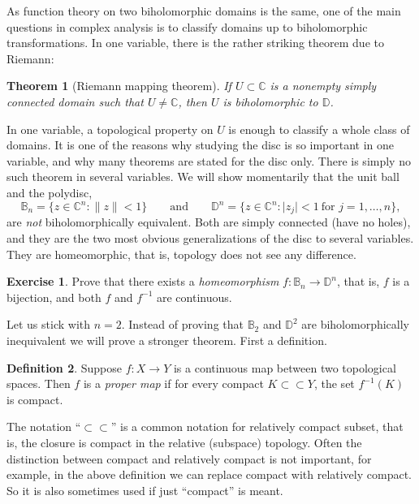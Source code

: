 \documentclass[12pt,openany]{book}
\newcommand{\sabs}[1]{\lvert {#1} \rvert}
\newcommand{\snorm}[1]{\lVert {#1} \rVert}
\newcommand{\C}{{\mathbb{C}}}
\newcommand{\D}{{\mathbb{D}}}
\newcommand{\bB}{{\mathbb{B}}}
\newcommand{\myindex}[1]{#1\index{#1}}
\theoremstyle{plain}
\newtheorem{thm}{Theorem}[section]
\theoremstyle{remark}
\theoremstyle{definition}
\newtheorem{defn}[thm]{Definition}
\newenvironment{exbox}{%
    \def\FrameCommand{\vrule width 1pt \relax\hspace {10pt}}%
    \MakeFramed {\advance \hsize -\width \FrameRestore }%
}{%
    \endMakeFramed
}
\theoremstyle{exercise}
\newtheorem{exercise}{Exercise}[section]
\theoremstyle{example}
\begin{document}
As function theory on two biholomorphic domains is the same,
one of the main questions in complex analysis is to classify domains up
to biholomorphic transformations.  In one variable, there is the rather
striking theorem due to Riemann:

\begin{thm}[Riemann mapping theorem]
If $U \subset \C$ is a nonempty simply connected domain such that $U \neq \C$,
then $U$ is biholomorphic to $\D$.
\end{thm}

In one variable, a topological property on $U$ is enough to classify a whole
class of domains.  It is one of the reasons why studying the disc is so
important in one variable, and why many theorems are stated for
the disc only.
There is simply no such theorem in several variables.
We will show momentarily that the unit ball and the polydisc,
\begin{equation*}
\bB_n = \bigl\{ z \in \C^n : \snorm{z} < 1 \bigr\}
\qquad \text{and} \qquad
\D^n = \bigl\{ z \in \C^n : \sabs{z_j} < 1 ~\text{for $j=1,\ldots,n$} \bigr\} ,
\end{equation*}
are \emph{not} biholomorphically equivalent.  Both are simply
connected (have no holes), and they are the two most obvious generalizations
of the disc to several variables.  They are homeomorphic, that is, topology
does not see any difference.

\begin{exbox}
\begin{exercise}
Prove that there exists a \emph{\myindex{homeomorphism}} $f \colon \bB_n \to
\D^n$,
that is, $f$ is a bijection, and both $f$ and $f^{-1}$ are continuous.
\end{exercise}
\end{exbox}


Let us stick with $n=2$.
Instead of proving that $\bB_2$ and
$\D^2$ are biholomorphically 
inequivalent we will prove a stronger theorem.  First a
definition.

\begin{defn}
Suppose $f \colon X \to Y$ is a continuous map between two topological
spaces.  Then $f$ is a \emph{\myindex{proper map}} if for every compact
%
%
$K \subset \subset Y$, the set $f^{-1}(K)$ is compact.
\end{defn}

The notation ``$\subset \subset$'' is a common notation for relatively
compact subset, that is, the closure is compact in the relative (subspace)
topology.  Often the distinction between compact and relatively
compact is not important, for example, in the above definition we can replace
compact with relatively compact.  So it is also sometimes used if just
``compact'' is meant.
\end{document}
